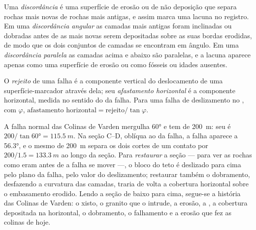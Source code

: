 \begin{definition}\label{def:b1:cross-sections:unconformity}
Uma \emph{discordância} é uma superfície de erosão ou de não deposição que separa rochas mais novas de rochas mais antigas, e assim marca uma lacuna no registro. Em uma \emph{discordância angular} as camadas mais antigas foram inclinadas ou dobradas antes de as mais novas serem depositadas sobre as suas bordas erodidas, de modo que os dois conjuntos de camadas se encontram em ângulo. Em uma \emph{discordância paralela} as camadas acima e abaixo são paralelas, e a lacuna aparece apenas como uma superfície de erosão ou como fósseis ou idades ausentes.
\end{definition}

\begin{definition}\label{def:b1:cross-sections:throw}
O \emph{rejeito} de uma falha é a componente vertical do deslocamento de uma superfície-marcador através dela; seu \emph{afastamento horizontal} é a componente horizontal, medida no sentido do  da falha. Para uma falha de deslizamento no , com  $\varphi$,
$\text{afastamento horizontal} = \text{rejeito}/\tan\varphi$.
\end{definition}

A falha normal das Colinas de Varden mergulha \ang{60} e tem  de \qty{200}{m}: seu  é $200/\tan\ang{60} = \qty{115.5}{m}$. Na seção C--D, oblíqua ao  da falha, a falha aparece a \ang{56.3}, e o mesmo  de \qty{200}{m} separa os dois cortes de um contato por $200/1.5 = \qty{133.3}{m}$ ao longo da seção. Para \emph{restaurar} a seção --- para ver as rochas como eram antes de a falha se mover ---, o bloco do teto é deslizado para cima pelo plano da falha, pelo valor do deslizamento; restaurar também o dobramento, desfazendo a curvatura das camadas, traria de volta a cobertura horizontal sobre o embasamento erodido. Lendo a seção de baixo para cima, segue-se a história das Colinas de Varden: o xisto, o granito que o intrude, a erosão, a , a cobertura depositada na horizontal, o dobramento, o falhamento e a erosão que fez as colinas de hoje.

